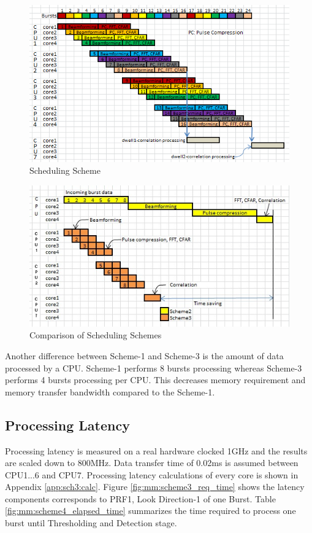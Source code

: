 \begin{figure}[h!]
	\centering
	\includegraphics[width=140mm]{figures/scheme4_data_distribution.png}
	\caption{Scheduling Scheme}
	\label{fig:mm:scheme4_data_distribution}
\end{figure}

\begin{figure}[h!]
	\centering
	\includegraphics[]{figures/scheme4_comparison}
	\caption{Comparison of Scheduling Schemes}
	\label{fig:mm:scheme4_comparison}
\end{figure}

Another difference between Scheme-1 and Scheme-3 is the amount of data processed by a CPU. Scheme-1 performs 8 bursts processing whereas Scheme-3 performs 4 bursts processing per CPU. This decreases memory requirement and memory transfer bandwidth compared to the Scheme-1.

\subsection{Processing Latency}
\label{ss:mm:scheme4:latency}
Processing latency is measured on a real hardware clocked 1GHz and the results are scaled down to 800MHz. Data transfer time of 0.02ms is assumed between CPU1...6 and CPU7. Processing latency calculations of every core is shown in Appendix \ref{app:sch3:calc}. Figure \ref{fig:mm:scheme3_req_time} shows the latency components corresponds to PRF1, Look Direction-1 of one Burst.  Table \ref{fig:mm:scheme4_elapsed_time} summarizes the time required to process one burst until Thresholding and Detection stage.

